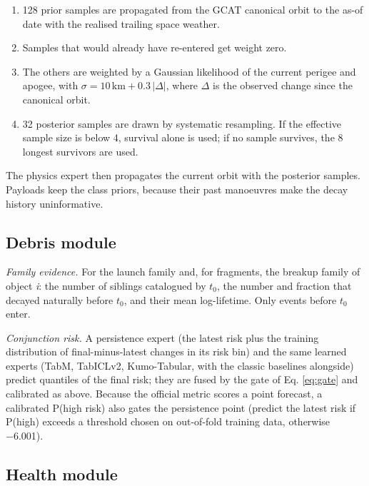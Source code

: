 \documentclass[
]{article}
\providecommand{\tightlist}{%
  \setlength{\itemsep}{0pt}\setlength{\parskip}{0pt}}
\begin{document}
\begin{enumerate}
\def\labelenumi{\arabic{enumi}.}
\tightlist
\item
  128 prior samples are propagated from the GCAT canonical orbit to the
  as-of date with the realised trailing space weather.
\item
  Samples that would already have re-entered get weight zero.
\item
  The others are weighted by a Gaussian likelihood of the current
  perigee and apogee, with \(\sigma = 10\,\text{km} + 0.3\,|\Delta|\),
  where \(\Delta\) is the observed change since the canonical orbit.
\item
  32 posterior samples are drawn by systematic resampling. If the
  effective sample size is below 4, survival alone is used; if no sample
  survives, the 8 longest survivors are used.
\end{enumerate}

The physics expert then propagates the current orbit with the posterior
samples. Payloads keep the class priors, because their past manoeuvres
make the decay history uninformative.

\subsection{Debris module}\label{debris-module}

\emph{Family evidence.} For the launch family and, for fragments, the
breakup family of object \emph{i}: the number of siblings catalogued by
\(t_0\), the number and fraction that decayed naturally before \(t_0\),
and their mean log-lifetime. Only events before \(t_0\) enter.

\emph{Conjunction risk.} A persistence expert (the latest risk plus the
training distribution of final-minus-latest changes in its risk bin) and
the same learned experts (TabM, TabICLv2, Kumo-Tabular, with the classic
baselines alongside) predict quantiles of the final risk; they are fused
by the gate of Eq. \ref{eq:gate} and calibrated as above. Because the
official metric scores a point forecast, a calibrated P(high risk) also
gates the persistence point (predict the latest risk if P(high) exceeds
a threshold chosen on out-of-fold training data, otherwise −6.001).

\subsection{Health module}\label{health-module}
\end{document}

